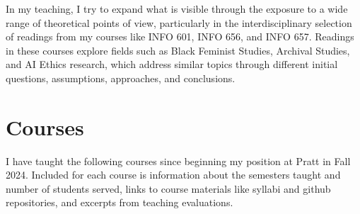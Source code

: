\documentclass[12pt]{article}
\begin{document}
In my teaching, I try to expand what is visible through the exposure
to a wide range of theoretical points of view, particularly in the
interdisciplinary selection of readings from my courses like INFO 601,
INFO 656, and INFO 657. Readings in these courses explore fields such
as Black Feminist Studies, Archival Studies, and AI Ethics research,
which address similar topics through different initial questions,
assumptions, approaches, and conclusions.

\section*{Courses}
\label{sec:org3e95dcf}
I have taught the following courses since beginning my position at
Pratt in Fall 2024. Included for each course is information about the
semesters taught and number of students served, links to course
materials like syllabi and github repositories, and excerpts from
teaching evaluations.
\end{document}
